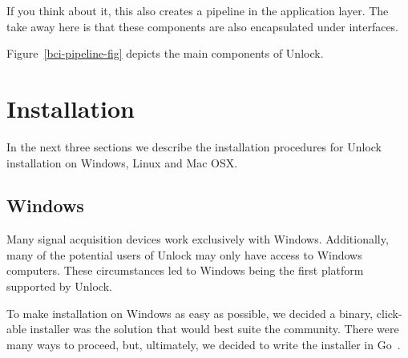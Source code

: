 \documentclass[11pt]{article}
\begin{document}
If you think about it, this also creates a pipeline in the application layer.  The take away here is that these
components are also encapsulated under interfaces.

Figure~\ref{bci-pipeline-fig} depicts the main components of Unlock.




\section{Installation}

In the next three sections we describe the installation procedures for Unlock installation on Windows, Linux and Mac OSX.  

\subsection{Windows}

Many signal acquisition devices work exclusively with Windows.  Additionally, many of the potential users of Unlock may only have access to Windows computers.  These circumstances led to Windows being the first platform supported by Unlock.

To make installation on Windows as easy as possible, we decided a binary, click-able installer was the solution that would best suite the community.  There were many ways to proceed, but, ultimately, we decided to write the installer in Go~\cite{golang}.  
\end{document}
